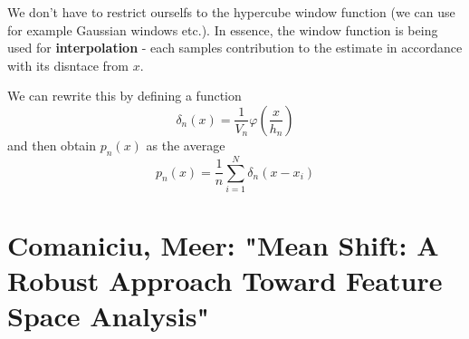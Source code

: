 \documentclass{scrartcl}
\begin{document}
\begin{appendices}
We don't have to restrict ourselfs to the hypercube window function (we can use for example Gaussian windows etc.). In essence, the window function is being used for \textbf{interpolation} - each samples contribution to the estimate in accordance with its disntace from \(x\).

We can rewrite this by defining a function 
\[\delta_n (x) = \frac{1}{V_n} \varphi (\frac{x}{h_n})\]
and then obtain \(p_n(x)\) as the average
\[p_n(x) = \frac{1}{n} \sum_{i=1}^N \delta_n(x-x_i)\]

\section{Comaniciu, Meer: "Mean Shift: A Robust Approach Toward Feature Space Analysis"}


\end{appendices}
\end{document}
